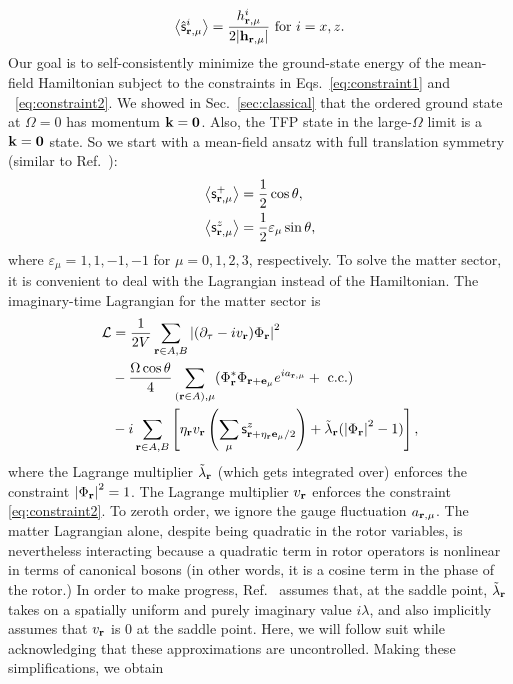 \documentclass[twocolumn,superscriptaddress,amsmath,amssymb,aps,prx,nofootinbib]{revtex4-2}
\begin{document}
\begin{equation}\label{eq:magfield}
    \expval{\hat{\mathsf{s}}^i_{\vb{r},\mu}}=\frac{h^i_{\vb{r},\mu}}{2\abs{\vb{h}_{\vb{r},\mu}}} \text{ for } i=x,z.
\end{equation}
Our goal is to self-consistently minimize the ground-state energy of the mean-field Hamiltonian subject to the constraints in Eqs.~\eqref{eq:constraint1} and ~\eqref{eq:constraint2}. We showed in Sec.~\ref{sec:classical} that the ordered ground state at $\Omega=0$ has momentum $\vb{k}=\boldsymbol{0}$. Also, the TFP state in the large-$\Omega$ limit is a $\vb{k}=\boldsymbol{0}$ state. So we start with a mean-field ansatz with full translation symmetry (similar to Ref.~\cite{savary2012coulombic}):
\begin{equation}
\begin{aligned}
    \expval{\mathsf{s}^+_{\vb{r},\mu}}&=\frac{1}{2}\cos\theta,\\
    \expval{\mathsf{s}^z_{\vb{r},\mu}}&=\frac{1}{2}\varepsilon_\mu \sin \theta, 
\end{aligned}
\end{equation}
where $\varepsilon_\mu=1,1,-1,-1$ for $\mu=0,1,2,3$, respectively. To solve the matter sector, it is convenient to deal with the Lagrangian instead of the Hamiltonian. The imaginary-time Lagrangian for the matter sector is
\begin{equation}
    \begin{aligned}
    \mathcal{L}& = \frac{1}{2V}\sum_{\vb{r} \in A,B}\abs{(\partial_\tau - i v_{\vb{r}}) \Phi_{\vb{r}}}^2\\ &-\frac{\Omega \cos \theta}{4}\sum_{(\vb{r}\in A), \mu}(\Phi_{\vb{r}}^* \Phi_{\vb{r}+\vb{e}_\mu}e^{ia_{\vb{r},\mu}}+\text{ c.c.})\\
    &-i \sum_{\mathbf{r} \in A,B} \left[ \eta_{\vb{r}} v_{\vb{r}} \left( \sum_{\mu}\mathsf{s}^z_{\vb{r}+\eta_{\vb{r}} \vb{e}_\mu/2}\right)+ \Tilde{\lambda}_{\vb{r}}(\abs{\Phi_{\vb{r}}}^2-1)\right] ,
    \end{aligned}
\end{equation}
where the Lagrange multiplier $\tilde{\lambda}_{\vb{r}}$ (which gets integrated over) enforces the constraint $\abs{\Phi_{\vb{r}}}^2=1$. The Lagrange multiplier $v_{\vb{r}}$ enforces the constraint \eqref{eq:constraint2}. To zeroth order, we ignore the gauge fluctuation $a_{\vb{r},\mu}$. The matter Lagrangian alone, despite being quadratic in the rotor variables, is nevertheless interacting  because a quadratic term in rotor operators is nonlinear in terms of canonical bosons (in other words, it is a cosine term in the phase of the rotor.) In order to make progress, Ref.~\cite{savary2012coulombic} assumes that, at the saddle point, $\Tilde{\lambda}_{\vb{r}}$ takes on a spatially uniform and purely imaginary value $i\lambda$, and also implicitly assumes that $v_{\vb{r}}$ is 0 at the saddle point. Here, we will follow suit while acknowledging that these approximations are uncontrolled. Making these simplifications, we obtain
\end{document}
